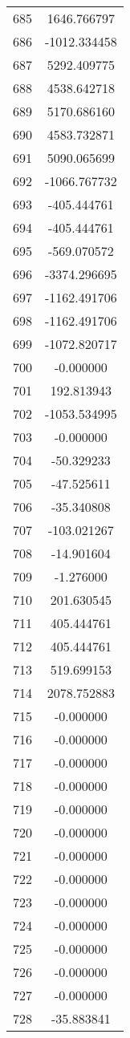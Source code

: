 \documentclass[12pt]{article}
\begin{document}
\begin{longtable}{@{}cc@{}}
685 & 1646.766797 \\
686 & -1012.334458 \\
687 & 5292.409775 \\
688 & 4538.642718 \\
689 & 5170.686160 \\
690 & 4583.732871 \\
691 & 5090.065699 \\
692 & -1066.767732 \\
693 & -405.444761 \\
694 & -405.444761 \\
695 & -569.070572 \\
696 & -3374.296695 \\
697 & -1162.491706 \\
698 & -1162.491706 \\
699 & -1072.820717 \\
700 & -0.000000 \\
701 & 192.813943 \\
702 & -1053.534995 \\
703 & -0.000000 \\
704 & -50.329233 \\
705 & -47.525611 \\
706 & -35.340808 \\
707 & -103.021267 \\
708 & -14.901604 \\
709 & -1.276000 \\
710 & 201.630545 \\
711 & 405.444761 \\
712 & 405.444761 \\
713 & 519.699153 \\
714 & 2078.752883 \\
715 & -0.000000 \\
716 & -0.000000 \\
717 & -0.000000 \\
718 & -0.000000 \\
719 & -0.000000 \\
720 & -0.000000 \\
721 & -0.000000 \\
722 & -0.000000 \\
723 & -0.000000 \\
724 & -0.000000 \\
725 & -0.000000 \\
726 & -0.000000 \\
727 & -0.000000 \\
728 & -35.883841 \\

\end{longtable}
\end{document}
